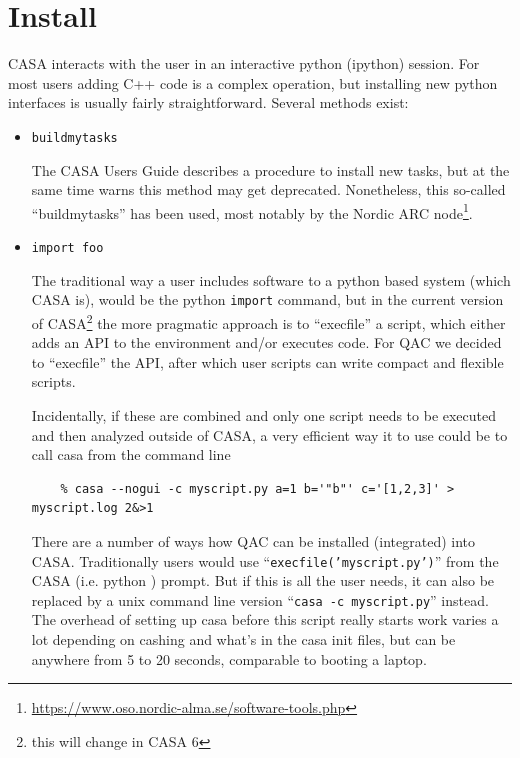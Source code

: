 \documentclass[11pt,twoside]{article}
\begin{document}
\section{Install}

CASA interacts with the user in an interactive python (ipython) session. For most users adding 
C++ code is a complex operation, but installing new python interfaces is usually fairly
straightforward. Several methods exist:



\begin{itemize}

  \item \verb+buildmytasks+

The CASA Users Guide describes a procedure to install new tasks, but at the same
time warns this method may get deprecated. Nonetheless, this so-called ``buildmytasks'' has been
used, most notably by the Nordic ARC node\footnote{\url{https://www.oso.nordic-alma.se/software-tools.php}}.

  

  \item \verb+import foo+

The traditional way a user includes software to a python based system (which CASA is),
would be the python {\tt import} command, but in the current version of
CASA\footnote{this will change in CASA 6}
the more pragmatic approach is to ``execfile'' a script, which either adds an API to the
environment and/or executes code. For QAC we decided to ``execfile'' the API, after
which user scripts can write compact and flexible scripts.

Incidentally, if these are combined and only one script needs to be executed and then analyzed
outside of CASA, a very efficient way it to use could be to call casa from the command line

\footnotesize
\begin{verbatim}
    % casa --nogui -c myscript.py a=1 b='"b"' c='[1,2,3]' > myscript.log 2&>1
\end{verbatim}
\normalsize

There are a number of ways how QAC can be installed (integrated) into CASA.
Traditionally users would use
``{\tt     execfile('myscript.py')}''
from the CASA (i.e. python ) prompt. But if this is all the user needs, it can
also be replaced by a unix command line version
``{\tt     casa -c myscript.py}''
instead. The overhead of setting up casa before this script really starts work
varies a lot depending on cashing and what's in the casa init files, but can
be anywhere from 5 to 20 seconds, comparable to booting a laptop.


\end{itemize}
\end{document}

